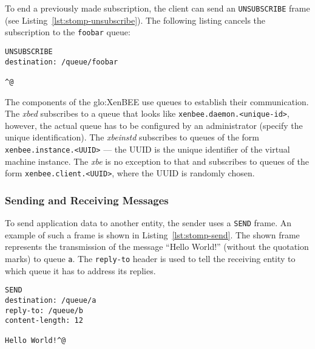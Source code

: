 To  end   a  previously  made   subscription,  the  client  can   send  an
\texttt{UNSUBSCRIBE} frame  (see Listing~\ref{lst:stomp-unsubscribe}). The
following listing cancels the subscription to the \texttt{foobar} queue:

\medskip
\begin{center}
  \begin{minipage}{.75\textwidth}
    \begin{lstlisting}[captionpos=b,backgroundcolor=\color{listingcolor},frame=lines,numbers=none,stepnumber=5,numberfirstline=false,numberstyle=\tiny,caption={The
        \texttt{UNSUBSCRIBE} frame revokes a previously made subscription.},label={lst:stomp-unsubscribe}]
UNSUBSCRIBE
destination: /queue/foobar

^@
    \end{lstlisting}
  \end{minipage}
\end{center}

\medskip

The  components of  the  \gls{glo:XenBEE} use  queues  to establish  their
communication.   The \emph{xbed}  subscribes to  a queue  that  looks like
\texttt{xenbee.daemon.<unique-id>},  however, the actual  queue has  to be
configured by  an administrator  (\ie specify the  unique identification).
The    \emph{xbeinstd}    subscribes     to    queues    of    the    form
\texttt{xenbee.instance.<UUID>} ---  the UUID is the  unique identifier of
the virtual machine  instance. The \emph{xbe} is no  exception to that and
subscribes to queues of  the form \texttt{xenbee.client.<UUID>}, where the
UUID is randomly chosen.


\subsubsection{Sending and Receiving Messages}

To  send   application  data  to   another  entity,  the  sender   uses  a
\texttt{SEND}  frame.    An  example   of  such  a   frame  is   shown  in
Listing~\ref{lst:stomp-send}. The shown  frame represents the transmission
of the  message ``Hello  World!'' (without the  quotation marks)  to queue
\texttt{a}.  The  \texttt{reply-to} header is  used to tell  the receiving
entity to which queue it has to address its replies.

\medskip
\begin{center}
  \begin{minipage}{.75\textwidth}
    \begin{lstlisting}[captionpos=b,backgroundcolor=\color{listingcolor},frame=lines,numbers=none,stepnumber=5,numberfirstline=false,numberstyle=\tiny,caption={The
        \texttt{SEND} frame is used to send application data.},label={lst:stomp-send}]
SEND
destination: /queue/a
reply-to: /queue/b
content-length: 12

Hello World!^@
    \end{lstlisting}
  \end{minipage}
\end{center}

